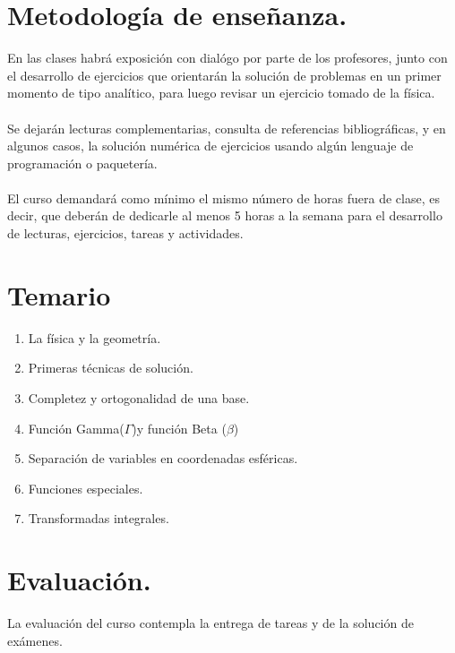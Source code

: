 \documentclass[12pt]{article}
\begin{document}
\section{Metodología de enseñanza.}
En las clases habrá exposición con dialógo por parte de los profesores, junto con el desarrollo de ejercicios que orientarán la solución de problemas en un primer momento de tipo analítico, para luego revisar un ejercicio tomado de la física.
\\
\\
Se dejarán lecturas complementarias, consulta de referencias bibliográficas, y en algunos casos, la solución numérica de ejercicios usando algún lenguaje de programación o paquetería.
\\
\\
El curso demandará como mínimo el mismo número de horas fuera de clase, es decir, que deberán de dedicarle al menos 5 horas a la semana para el desarrollo de lecturas, ejercicios, tareas y actividades.
\section{Temario}
\begin{enumerate}
\item La física y la geometría.
\item Primeras técnicas de solución.
\item Completez y ortogonalidad de una base.
\item Función Gamma($\Gamma$)y función Beta ($\beta$)
\item Separación de variables en coordenadas esféricas.
\item Funciones especiales.
\item Transformadas integrales.
\end{enumerate}
\section{Evaluación.}
La evaluación del curso contempla la entrega de tareas y de la solución de exámenes.
\end{document}

